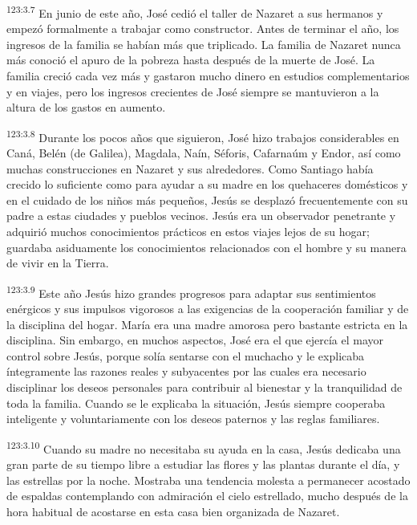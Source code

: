 \par
\textsuperscript{123:3.7} En junio de este año, José cedió el taller de Nazaret a sus hermanos y empezó formalmente a trabajar como constructor. Antes de terminar el año, los ingresos de la familia se habían más que triplicado. La familia de Nazaret nunca más conoció el apuro de la pobreza hasta después de la muerte de José. La familia creció cada vez más y gastaron mucho dinero en estudios complementarios y en viajes, pero los ingresos crecientes de José siempre se mantuvieron a la altura de los gastos en aumento.

\par
\textsuperscript{123:3.8} Durante los pocos años que siguieron, José hizo trabajos considerables en Caná, Belén (de Galilea), Magdala, Naín, Séforis, Cafarnaúm y Endor, así como muchas construcciones en Nazaret y sus alrededores. Como Santiago había crecido lo suficiente como para ayudar a su madre en los quehaceres domésticos y en el cuidado de los niños más pequeños, Jesús se desplazó frecuentemente con su padre a estas ciudades y pueblos vecinos. Jesús era un observador penetrante y adquirió muchos conocimientos prácticos en estos viajes lejos de su hogar; guardaba asiduamente los conocimientos relacionados con el hombre y su manera de vivir en la Tierra.

\par
\textsuperscript{123:3.9} Este año Jesús hizo grandes progresos para adaptar sus sentimientos enérgicos y sus impulsos vigorosos a las exigencias de la cooperación familiar y de la disciplina del hogar. María era una madre amorosa pero bastante estricta en la disciplina. Sin embargo, en muchos aspectos, José era el que ejercía el mayor control sobre Jesús, porque solía sentarse con el muchacho y le explicaba íntegramente las razones reales y subyacentes por las cuales era necesario disciplinar los deseos personales para contribuir al bienestar y la tranquilidad de toda la familia. Cuando se le explicaba la situación, Jesús siempre cooperaba inteligente y voluntariamente con los deseos paternos y las reglas familiares.

\par
\textsuperscript{123:3.10} Cuando su madre no necesitaba su ayuda en la casa, Jesús dedicaba una gran parte de su tiempo libre a estudiar las flores y las plantas durante el día, y las estrellas por la noche. Mostraba una tendencia molesta a permanecer acostado de espaldas contemplando con admiración el cielo estrellado, mucho después de la hora habitual de acostarse en esta casa bien organizada de Nazaret.

